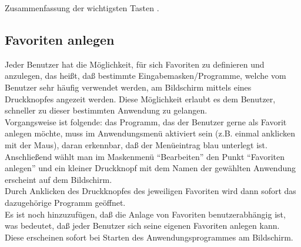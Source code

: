 \begin{Keys}{Zusammenfassung der wichtigsten Tasten}
.
\end{Keys}

\subsection{Favoriten anlegen}

Jeder Benutzer hat die M\"{o}glichkeit, f\"{u}r sich
Favoriten zu definieren und anzulegen, das hei{\ss}t, da{\ss} bestimmte
Eingabemasken/Programme, welche vom Benutzer sehr h\"{a}ufig verwendet werden, am
Bildschirm mittels eines Druckknopfes angezeit werden. Diese
M\"{o}glichkeit erlaubt es dem Benutzer, schneller zu dieser bestimmten
Anwendung zu gelangen.\\
Vorgangsweise ist folgende: das Programm, das der Benutzer gerne als Favorit
anlegen m\"{o}chte, muss im Anwendungsmen\"{u} aktiviert sein (z.B. einmal
anklicken mit der Maus), daran erkennbar, da{\ss}  der Men\"{u}eintrag blau
unterlegt ist. Anschlie{\ss}end w\"{a}hlt man im Maskenmen\"{u}  ``Bearbeiten''
den Punkt ``Favoriten anlegen'' und ein kleiner Druckknopf mit dem Namen der
gew\"{a}hlten Anwendung erscheint auf dem Bildschirm.\\
Durch Anklicken des Druckknopfes des jeweiligen Favoriten wird dann
sofort das dazugeh\"{o}rige Programm ge\"{o}ffnet.\\
Es ist noch hinzuzuf\"{u}gen, da{\ss} die Anlage von Favoriten
benutzerabh\"{a}ngig ist, was bedeutet, da{\ss} jeder Benutzer sich seine
eigenen Favoriten anlegen kann. Diese erscheinen sofort bei Starten des
Anwendungsprogrammes am Bildschirm.
